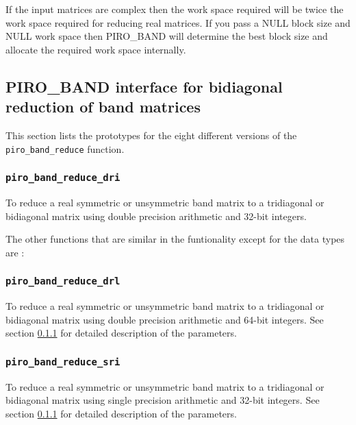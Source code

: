 \documentclass[11pt]{article}
\begin{document}
If the input matrices are complex then the work space required will be twice
the work space required for reducing real matrices. If you pass a NULL block
size and NULL work space then PIRO\_BAND will determine the best block size and
allocate the required work space internally.

\subsection{PIRO\_BAND interface for bidiagonal reduction of band matrices}
\label{reduce_all}

This section lists the prototypes for the eight different versions of the
{\tt piro\_band\_reduce} function.

\subsubsection{{\tt piro\_band\_reduce\_dri}} \label{reduce}


To reduce a real symmetric or unsymmetric band matrix to a tridiagonal or
bidiagonal matrix using double precision arithmetic and 32-bit integers.

The other functions that are similar in the funtionality except for the data
types are :

\subsubsection{{\tt piro\_band\_reduce\_drl}}

To reduce a real symmetric or unsymmetric band matrix to a
tridiagonal or bidiagonal matrix using double precision arithmetic and 64-bit
integers. See section \ref{reduce} for detailed description of the parameters.

\subsubsection{{\tt piro\_band\_reduce\_sri}}

To reduce a real symmetric or unsymmetric band matrix to a
tridiagonal or bidiagonal matrix using single precision arithmetic and 
32-bit integers. See section \ref{reduce} for detailed description of the parameters.
\end{document}
